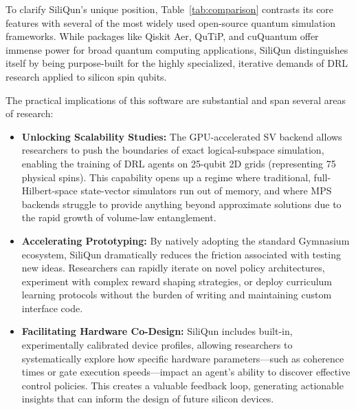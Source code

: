 \documentclass[preprint,12pt, a4paper]{elsarticle}
\begin{document}
To clarify SiliQun's unique position, Table~\ref{tab:comparison} contrasts its core features with several of the most widely used open-source quantum simulation frameworks. While packages like Qiskit Aer, QuTiP, and cuQuantum offer immense power for broad quantum computing applications, SiliQun distinguishes itself by being purpose-built for the highly specialized, iterative demands of DRL research applied to silicon spin qubits.

\begin{table}[htbp]
\centering
\caption{Comparison of SiliQun with existing quantum simulation frameworks.}
\label{tab:comparison}
\end{table}

The practical implications of this software are substantial and span several areas of research:
\begin{itemize}
    \item \textbf{Unlocking Scalability Studies:} The GPU-accelerated SV backend allows researchers to push the boundaries of exact logical-subspace simulation, enabling the training of DRL agents on 25-qubit 2D grids (representing 75 physical spins). This capability opens up a regime where traditional, full-Hilbert-space state-vector simulators run out of memory, and where MPS backends struggle to provide anything beyond approximate solutions due to the rapid growth of volume-law entanglement.
    \item \textbf{Accelerating Prototyping:} By natively adopting the standard Gymnasium ecosystem, SiliQun dramatically reduces the friction associated with testing new ideas. Researchers can rapidly iterate on novel policy architectures, experiment with complex reward shaping strategies, or deploy curriculum learning protocols without the burden of writing and maintaining custom interface code.
    \item \textbf{Facilitating Hardware Co-Design:} SiliQun includes built-in, experimentally calibrated device profiles, allowing researchers to systematically explore how specific hardware parameters---such as coherence times or gate execution speeds---impact an agent's ability to discover effective control policies. This creates a valuable feedback loop, generating actionable insights that can inform the design of future silicon devices.
\end{itemize}
\end{document}
